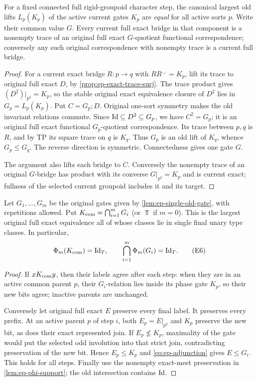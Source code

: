 \begin{lemma}
\label{lem:ep-single-old-gate}
For a fixed connected full rigid-groupoid character step,
the canonical largest old lifts \(L_p(K_p)\) of the
active current gates \(K_p\) are \emph{equal} for all
active sorts \(p\). Write their common value \(G\).
Every current full exact bridge in that component is a
nonempty trace of an original full exact \(G\)-quotient
functional correspondence; conversely any such original
correspondence with nonempty trace is a current full bridge.
\end{lemma}
\begin{proof}
For a current exact bridge \(R:p\to q\) with
\(RR^\smile=K_p\), lift its trace to original full exact
\(D\), by \cref{prop:ep-exact-trace-surj}.
The trace product gives
\((D^2)|_{p^2}=K_p\), so the stable original exact
equivalence closure of \(D^2\) lies in
\(G_p=L_p(K_p)\).
Put \(C=G_p;D\). Original one-sort symmetry makes the
old invariant relations commute. Since
\(\mathrm{Id}\subseteq D^2\subseteq G_p\),
we have \(C^2=G_p\); it is an original full exact
functional \(G_p\)-quotient correspondence. Its trace
between \(p,q\) is \(R\), and by TP its square trace
on \(q\) is \(K_q\). Thus \(G_p\) is an old lift of
\(K_q\), whence \(G_p\le G_q\). The reverse direction is
symmetric. Connectedness gives one gate \(G\).

The argument also lifts each bridge to \(C\).
Conversely the nonempty trace of an original \(G\)-bridge
has product with its converse \(G|_{p^2}=K_p\) and is
current exact; fullness of the selected current groupoid
includes it and its target.
\end{proof}

\begin{proposition}
\label{prop:ep-common-kernel}
Let \(G_1,\ldots,G_m\) be the original gates given by
\cref{lem:ep-single-old-gate}, with repetitions allowed.
Put \(K_{\rm com}=\bigcap_{i=1}^mG_i\) (or \(\Top\)
if \(m=0\)). This is the largest original full exact
equivalence all of whose classes lie in single final
unary type classes. In particular,
\[
  \Phi_m(K_{\rm com})=\mathrm{Id}_T,
  \qquad \bigcap_{i=1}^m\Phi_m(G_i)=\mathrm{Id}_T.
 \tag{E6}\label{eq:ep-common-kernel}
\]
\end{proposition}
\begin{proof}
If \(xK_{\rm com}y\), then their labels agree after
each step: when they are in an active common parent \(p\),
their \(G_i\)-relation lies inside its phase gate \(K_p\),
so their new bits agree; inactive parents are unchanged.

Conversely let original full exact \(E\) preserve
every final label. It preserves every prefix.
At an active parent \(p\) of step \(i\), both
\(E_p=E|_{p^2}\) and \(K_p\) preserve the new bit,
as does their exact represented join. If
\(E_p\not\le K_p\), maximality of the gate would put
the selected odd involution into that strict join,
contradicting preservation of the new bit. Hence
\(E_p\le K_p\) and \eqref{eq:ep-adjunction} gives
\(E\le G_i\). This holds for all steps. Finally use
the nonempty exact-meet preservation in
\cref{lem:ep-phi-support}; the old intersection
contains \(\mathrm{Id}\).
\end{proof}

